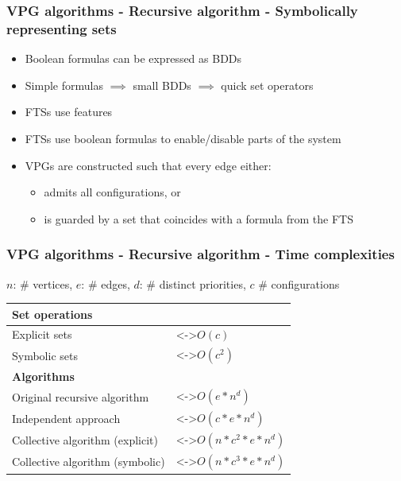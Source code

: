 \documentclass[aspectratio=169]{beamer}
\newcounter{picite}
\begin{document}
\begin{frame}[t]
\frametitle{VPG algorithms - Recursive algorithm - Symbolically representing sets}
	\begin{itemize}
		\item Boolean formulas can be expressed as BDDs
		\item Simple formulas $\implies$ small BDDs $\implies$ quick set operators\pause
		\item FTSs use features
		\item FTSs use boolean formulas to enable/disable parts of the system\pause
		\item VPGs are constructed such that every edge either:
		\begin{itemize}
			\item admits all configurations, or
			\item is guarded by a set that coincides with a formula from the FTS
		\end{itemize}
	\end{itemize}
\end{frame}



\begin{frame}[t]
\frametitle{VPG algorithms - Recursive algorithm - Time complexities}
\small$n$: \# vertices, $e$: \# edges, $d$: \# distinct priorities, $c$ \# configurations\normalsize\\
\setcounter{picite}{0}%
\begin{tabular}{|l|m{3cm}|}
	\hline
	\multicolumn{2}{|l|}{\textbf{Set operations}} \\\hline
	Explicit sets & \stepcounter{picite}\only<\thepicite->{$O(c)$} \\\hline
	Symbolic sets & \only<\thepicite->{$O(c^2)$} \\\hline\hline
	\multicolumn{2}{|l|}{\textbf{Algorithms}} \\\hline
	Original recursive algorithm & \stepcounter{picite}\only<\thepicite->{$O(e*n^d)$} \\\hline
	Independent approach & \only<\thepicite->{$O(c * e * n ^d)$} \\\hline
	Collective algorithm (explicit) & \stepcounter{picite}\only<\thepicite->{$O(n*c^2*e*n^d)$}\\\hline
	Collective algorithm (symbolic) & \stepcounter{picite}\only<\thepicite->{$O(n*c^3*e*n^d)$}\\\hline
\end{tabular}
\end{frame}
\end{document}
